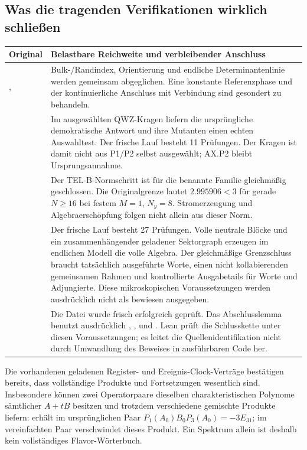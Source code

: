 \subsection*{Was die tragenden Verifikationen wirklich schließen}
\begin{tabularx}{\linewidth}{L{29mm}Y}
\toprule
Original & Belastbare Reichweite und verbleibender Anschluss\\\midrule
{},  &
Bulk-/Randindex, Orientierung und endliche Determinantenlinie werden gemeinsam abgeglichen. Eine konstante Referenzphase und der kontinuierliche Anschluss mit Verbindung sind gesondert zu behandeln.\\
 &
Im ausgewählten QWZ-Kragen liefern die ursprüngliche demokratische Antwort und ihre Mutanten einen echten Auswahltest. Der frische Lauf besteht 11 Prüfungen. Der Kragen ist damit nicht aus P1/P2 selbst ausgewählt; AX.P2 bleibt Ursprungsannahme.\\
 &
Der TEL-B-Normschritt ist für die benannte Familie gleichmäßig geschlossen. Die Originalgrenze lautet $2.995906<3$ für gerade $N\ge16$ bei festem $M=1$, $N_y=8$. Stromerzeugung und Algebraerschöpfung folgen nicht allein aus dieser Norm.\\
 &
Der frische Lauf besteht 27 Prüfungen. Volle neutrale Blöcke und ein zusammenhängender geladener Sektorgraph erzeugen im endlichen Modell die volle Algebra. Der gleichmäßige Grenzschluss braucht tatsächlich ausgeführte Worte, einen nicht kollabierenden gemeinsamen Rahmen und kontrollierte Ausgabetails für Worte und Adjungierte. Diese mikroskopischen Voraussetzungen werden ausdrücklich nicht als bewiesen ausgegeben.\\
 &
Die Datei wurde frisch erfolgreich geprüft. Das Abschlusslemma benutzt ausdrücklich , ,  und . Lean prüft die Schlusskette unter diesen Voraussetzungen; es leitet die Quellenidentifikation nicht durch Umwandlung des Beweises in ausführbaren Code her.\\
\bottomrule
\end{tabularx}

Die vorhandenen geladenen Register- und Ereignis-Clock-Verträge bestätigen bereits, dass vollständige Produkte und Fortsetzungen wesentlich sind. Insbesondere können zwei Operatorpaare dieselben charakteristischen Polynome sämtlicher $A+tB$ besitzen und trotzdem verschiedene gemischte Produkte liefern:  erhält im ursprünglichen Paar $P_1(A_0)B_0P_3(A_0)=-3E_{31}$; im vereinfachten Paar verschwindet dieses Produkt. Ein Spektrum allein ist deshalb kein vollständiges Flavor-Wörterbuch.


